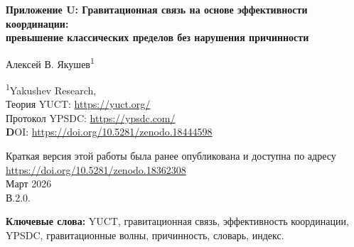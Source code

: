 \documentclass[12pt,a4paper]{article}
\newcommand{\Keff}{K_{\mathrm{eff}}}
\begin{document}
	
	\begin{titlepage}
		\begin{center}
			\vspace*{1cm}
			\Huge \textbf{Приложение U: Гравитационная связь на основе эффективности координации: \\ превышение классических пределов без нарушения причинности}
			
			\vspace{1cm}
			\Large Алексей В. Якушев\textsuperscript{1}
			
			\vspace{0.5cm}
			\large \textsuperscript{1}Yakushev Research, \\
			Теория YUCT: \url{https://yuct.org/}\\
			Протокол YPSDC: \url{https://ypsdc.com/}\\
			
			\vspace{2cm}
			\textbf DOI: \url{https://doi.org/10.5281/zenodo.18444598}\\
			
			\vspace{1cm}
			
			\vspace{0cm}
			\large 
			Краткая версия этой работы была ранее опубликована и доступна по адресу\\ \url{https://doi.org/10.5281/zenodo.18362308}\\
			\vspace{1cm}
			Март 2026 \\ \large В.2.0.
			
			\newpage
			\vspace{2cm}
			\begin{abstract}
				\noindent
				Мы предлагаем новый подход к дальней связи, основанный на объединяющей теории координации Якушева (YUCT). Рассматривая гравитационное поле как естественным образом возникающий глобальный словарь, мы показываем, что короткие индексы (гравитационные возмущения) могут координировать состояния между удалёнными наблюдателями с эффективной эффективностью \(\Keff\), которая формально превышает предел скорости света, но без нарушения причинности. Ключевым моментом является разделение автономного распространения словаря (уже существующее гравитационное поле) и передачи индекса онлайн (гравитационная волна, распространяющаяся со скоростью света). Гравитационные волны проникают сквозь вещество без ослабления, что даёт значительное преимущество перед электромагнитными сигналами. Мы выводим основные уравнения, оцениваем достижимые эффективности и предлагаем экспериментальную проверку с использованием высокоточных гравиметров. Эта работа открывает путь к новому классу систем связи, в которых задержка определяется локальной обработкой, а не расстоянием.
			\end{abstract}
			
			\vspace{0.5cm}
			\noindent \textbf{Ключевые слова:} YUCT, гравитационная связь, эффективность координации, YPSDC, гравитационные волны, причинность, словарь, индекс.
		\end{center}
	\end{titlepage}
	
\end{document}
